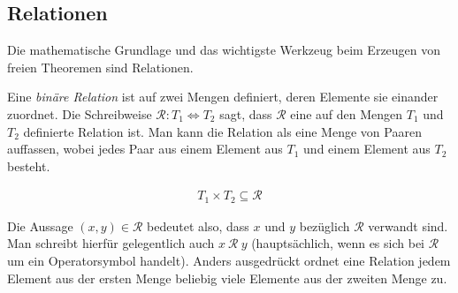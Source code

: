 





\subsection{Relationen}

Die mathematische Grundlage und das wichtigste Werkzeug beim Erzeugen von freien Theoremen sind Relationen.


Eine \textit{binäre Relation} ist auf zwei Mengen definiert, deren Elemente sie einander zuordnet. Die Schreibweise
$\mathcal{R} : T_1 \Leftrightarrow T_2$ sagt, dass $\mathcal{R}$ eine auf den Mengen $T_1$ und $T_2$ definierte
Relation ist. Man kann die Relation als eine Menge von Paaren auffassen, wobei jedes Paar aus einem Element aus $T_1$ und einem
Element aus $T_2$ besteht.

\begin{align*}
T_1 \times T_2 \subseteq \mathcal{R}
\end{align*}

Die Aussage $(x, y) \in \mathcal{R}$ bedeutet also, dass $x$ und $y$ bezüglich $\mathcal{R}$ verwandt sind. Man schreibt hierfür
gelegentlich auch $x\ \mathcal{R}\ y$ (hauptsächlich, wenn es sich bei $\mathcal{R}$ um ein Operatorsymbol handelt).
Anders ausgedrückt ordnet eine Relation jedem Element aus der ersten Menge beliebig viele Elemente aus der zweiten Menge zu.

